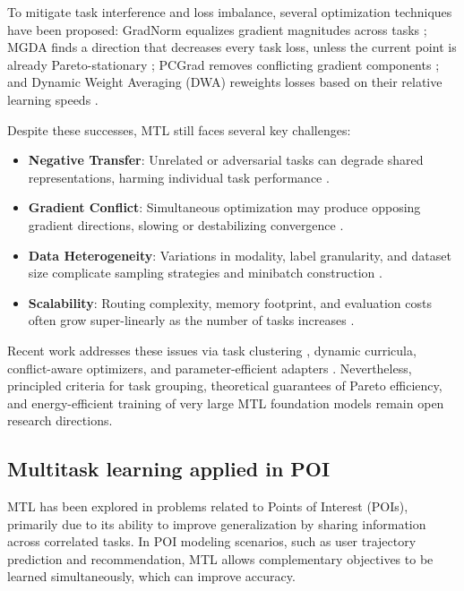 To mitigate task interference and loss imbalance, several optimization techniques have been proposed: GradNorm equalizes gradient magnitudes across tasks \cite{chen2018gradnorm}; MGDA finds a direction that decreases every task loss, unless the current point is already Pareto-stationary \cite{sener2018mgda};
PCGrad removes conflicting gradient components \cite{yu2020pcgrad}; and Dynamic Weight Averaging (DWA) reweights losses based on their relative learning speeds \cite{liu2019dwa}.

Despite these successes, MTL still faces several key challenges:
\begin{itemize}
  \item \textbf{Negative Transfer}: Unrelated or adversarial tasks can degrade shared representations, harming individual task performance \cite{ruder2017sluice,zhang2021survey}.
  \item \textbf{Gradient Conflict}: Simultaneous optimization may produce opposing gradient directions, slowing or destabilizing convergence \cite{yu2020pcgrad,sener2018mgda}.
  \item \textbf{Data Heterogeneity}: Variations in modality, label granularity, and dataset size complicate sampling strategies and minibatch construction \cite{nash,standley2020tasks}.
  \item \textbf{Scalability}: Routing complexity, memory footprint, and evaluation costs often grow super-linearly as the number of tasks increases \cite{zhang2021survey,yu2024survey}.
\end{itemize}

Recent work addresses these issues via task clustering \cite{standley2020tasks}, dynamic curricula, conflict-aware optimizers, and parameter-efficient adapters \cite{yu2024survey}. Nevertheless, principled criteria for task grouping, theoretical guarantees of Pareto efficiency, and energy-efficient training of very large MTL foundation models remain open research directions.

\subsection{Multitask learning applied in POI}
MTL has been explored in problems related to Points of Interest (POIs), primarily due to its ability to improve generalization by sharing information across correlated tasks. In POI modeling scenarios, such as user trajectory prediction and recommendation, MTL allows complementary objectives to be learned simultaneously, which can improve accuracy.

